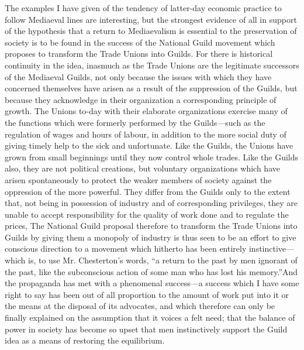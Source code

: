 \documentclass{book}
\begin{document}
The examples I have given of the tendency of latter-day economic practice to follow Mediaeval lines are interesting, but the strongest evidence of all in support of the hypothesis that a return to Mediaevalism is essential to the preservation of society is to be found in the success of the National Guild movement which proposes to transform the Trade Unions into Guilds. For there is historical continuity in the idea, inasmuch as the Trade Unions are the legitimate successors of the Mediaeval Guilds, not only because the issues with which they have concerned themselves have arisen as a result of the suppression of the Guilds, but because they acknowledge in their organization a corresponding principle of growth. The Unions to-day with their elaborate organizations exercise many of the functions which were formerly performed by the Guilds—such as the regulation of wages and hours of labour, in addition to the more social duty of giving timely help to the sick and unfortunate. Like the Guilds, the Unions have grown from small beginnings until they now control whole trades. Like the Guilds also, they are not political creations, but voluntary organizations which have arisen spontaneously to protect the weaker members of society against the oppression of the more powerful. They differ from the Guilds only to the extent that, not being in possession of industry and of corresponding privileges, they are unable to accept responsibility for the quality of work done and to regulate the prices, The National Guild proposal therefore to transform the Trade Unions into Guilds by giving them a monopoly of industry is thus seen to be an effort to give conscious direction to a movement which hitherto has been entirely instinctive—which is, to use Mr. Chesterton’s words, “a return to the past by men ignorant of the past, like the subconscious action of some man who has lost his memory.”\footnotemark[2] And the propaganda has met with a phenomenal success—a success which I have some right to say has been out of all proportion to the amount of work put into it or the means at the disposal of its advocates, and which therefore can only be finally explained on the assumption that it voices a felt need; that the balance of power in society has become so upset that men instinctively support the Guild idea as a means of restoring the equilibrium.
\end{document}
